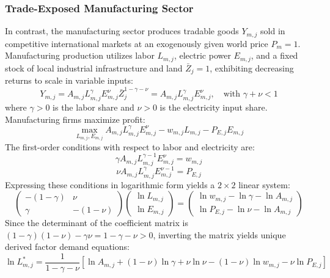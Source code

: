 \documentclass[11pt,a4paper]{article}
\begin{document}
\subsubsection{Trade-Exposed Manufacturing Sector}
In contrast, the manufacturing sector produces tradable goods $Y_{m,j}$ sold in competitive international markets at an exogenously given world price $P_m = 1$. Manufacturing production utilizes labor $L_{m,j}$, electric power $E_{m,j}$, and a fixed stock of local industrial infrastructure and land $\bar{Z}_j = 1$, exhibiting decreasing returns to scale in variable inputs:
\begin{equation}\label{eq:mfg_prod}
    Y_{m,j} = A_{m,j} L_{m,j}^\gamma E_{m,j}^\nu \bar{Z}_j^{1-\gamma-\nu} = A_{m,j} L_{m,j}^\gamma E_{m,j}^\nu, \quad \text{with } \gamma + \nu < 1
\end{equation}
where $\gamma > 0$ is the labor share and $\nu > 0$ is the electricity input share. Manufacturing firms maximize profit:
\begin{equation}
    \max_{L_{m,j}, E_{m,j}} A_{m,j} L_{m,j}^\gamma E_{m,j}^\nu - w_{m,j} L_{m,j} - P_{E,j} E_{m,j}
\end{equation}
The first-order conditions with respect to labor and electricity are:
\begin{equation}
    \gamma A_{m,j} L_{m,j}^{\gamma-1} E_{m,j}^\nu = w_{m,j}
\end{equation}
\begin{equation}
    \nu A_{m,j} L_{m,j}^\gamma E_{m,j}^{\nu-1} = P_{E,j}
\end{equation}
Expressing these conditions in logarithmic form yields a $2 \times 2$ linear system:
\begin{equation}
    \begin{pmatrix} -(1-\gamma) & \nu \\ \gamma & -(1-\nu) \end{pmatrix} \begin{pmatrix} \ln L_{m,j} \\ \ln E_{m,j} \end{pmatrix} = \begin{pmatrix} \ln w_{m,j} - \ln \gamma - \ln A_{m,j} \\ \ln P_{E,j} - \ln \nu - \ln A_{m,j} \end{pmatrix}
\end{equation}
Since the determinant of the coefficient matrix is $(1-\gamma)(1-\nu) - \gamma\nu = 1 - \gamma - \nu > 0$, inverting the matrix yields unique derived factor demand equations:
\begin{equation}\label{eq:mfg_labor_demand}
    \ln L_{m,j}^* = \frac{1}{1-\gamma-\nu} \left[ \ln A_{m,j} + (1-\nu)\ln \gamma + \nu \ln \nu - (1-\nu)\ln w_{m,j} - \nu \ln P_{E,j} \right]
\end{equation}
\end{document}

